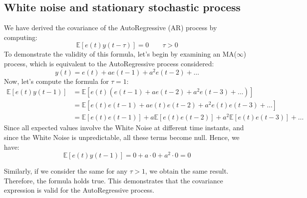 \subsection{White noise and stationary stochastic process}
We have derived the covariance of the AutoRegressive (AR) process by computing:
\[\mathbb{E}\left[e(t)y(t-\tau)\right]=0 \qquad \tau >0\]
To demonstrate the validity of this formula, let's begin by examining an MA($\infty$) process, which is equivalent to the AutoRegressive process considered:
\[y(t)=e(t)+ae(t-1)+a^2e(t-2)+\dots\]
Now, let's compute the formula for $\tau = 1$:
\begin{align*}
    \mathbb{E}\left[e(t)y(t-1)\right]   &= \mathbb{E}\left[e(t)\left(e(t-1)+ae(t-2)+a^2e(t-3)+\dots\right)\right] \\ 
                                        &= \mathbb{E}\left[e(t)e(t-1)+ae(t)e(t-2)+a^2e(t)e(t-3)+\dots\right] \\ 
                                        &= \mathbb{E}\left[e(t)e(t-1)\right]+a\mathbb{E}\left[e(t)e(t-2)\right]+a^2\mathbb{E}\left[e(t)e(t-3)\right]+\dots                                      
\end{align*}
Since all expected values involve the White Noise at different time instants, and since the White Noise is unpredictable, all these terms become null.
Hence, we have:
\[\mathbb{E}\left[e(t)y(t-1)\right]=0+a\cdot 0+a^2\cdot 0=0\]

Similarly, if we consider the same for any $\tau > 1$, we obtain the same result. 
Therefore, the formula holds true. 
This demonstrates that the covariance expression is valid for the AutoRegressive process.